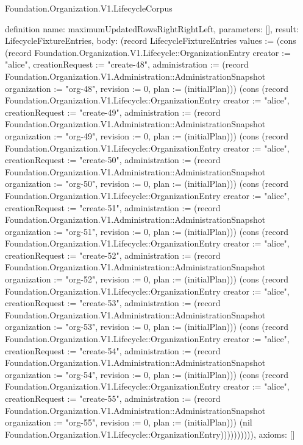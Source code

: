 \begin{lexlean}{Foundation.Organization.V1.LifecycleCorpus}
\begin{semanticmodule}
definition{
  name: maximumUpdatedRowsRightRightLeft,
  parameters: [],
  result: LifecycleFixtureEntries,
  body: (record LifecycleFixtureEntries {values := (cons (record Foundation.Organization.V1.Lifecycle::OrganizationEntry {creator := "alice", creationRequest := "create-48", administration := (record Foundation.Organization.V1.Administration::AdministrationSnapshot {organization := "org-48", revision := 0, plan := (initialPlan)})}) (cons (record Foundation.Organization.V1.Lifecycle::OrganizationEntry {creator := "alice", creationRequest := "create-49", administration := (record Foundation.Organization.V1.Administration::AdministrationSnapshot {organization := "org-49", revision := 0, plan := (initialPlan)})}) (cons (record Foundation.Organization.V1.Lifecycle::OrganizationEntry {creator := "alice", creationRequest := "create-50", administration := (record Foundation.Organization.V1.Administration::AdministrationSnapshot {organization := "org-50", revision := 0, plan := (initialPlan)})}) (cons (record Foundation.Organization.V1.Lifecycle::OrganizationEntry {creator := "alice", creationRequest := "create-51", administration := (record Foundation.Organization.V1.Administration::AdministrationSnapshot {organization := "org-51", revision := 0, plan := (initialPlan)})}) (cons (record Foundation.Organization.V1.Lifecycle::OrganizationEntry {creator := "alice", creationRequest := "create-52", administration := (record Foundation.Organization.V1.Administration::AdministrationSnapshot {organization := "org-52", revision := 0, plan := (initialPlan)})}) (cons (record Foundation.Organization.V1.Lifecycle::OrganizationEntry {creator := "alice", creationRequest := "create-53", administration := (record Foundation.Organization.V1.Administration::AdministrationSnapshot {organization := "org-53", revision := 0, plan := (initialPlan)})}) (cons (record Foundation.Organization.V1.Lifecycle::OrganizationEntry {creator := "alice", creationRequest := "create-54", administration := (record Foundation.Organization.V1.Administration::AdministrationSnapshot {organization := "org-54", revision := 0, plan := (initialPlan)})}) (cons (record Foundation.Organization.V1.Lifecycle::OrganizationEntry {creator := "alice", creationRequest := "create-55", administration := (record Foundation.Organization.V1.Administration::AdministrationSnapshot {organization := "org-55", revision := 0, plan := (initialPlan)})}) (nil Foundation.Organization.V1.Lifecycle::OrganizationEntry)))))))))}),
  axioms: []
}


\end{semanticmodule}
\end{lexlean}
